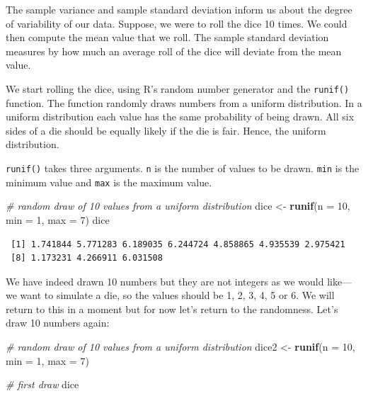 \documentclass[]{article}
\newenvironment{Shaded}{\begin{snugshade}}{\end{snugshade}}
\newcommand{\CommentTok}[1]{\textcolor[rgb]{0.56,0.35,0.01}{\textit{#1}}}
\newcommand{\DataTypeTok}[1]{\textcolor[rgb]{0.13,0.29,0.53}{#1}}
\newcommand{\DecValTok}[1]{\textcolor[rgb]{0.00,0.00,0.81}{#1}}
\newcommand{\KeywordTok}[1]{\textcolor[rgb]{0.13,0.29,0.53}{\textbf{#1}}}
\newcommand{\NormalTok}[1]{#1}
\newcommand{\StringTok}[1]{\textcolor[rgb]{0.31,0.60,0.02}{#1}}
\begin{document}
The sample variance and sample standard deviation inform us about the degree of variability of our data. Suppose, we were to roll the dice 10 times. We could then compute the mean value that we roll. The sample standard deviation measures by how much an average roll of the dice will deviate from the mean value.

We start rolling the dice, using R's random number generator and the \texttt{runif()} function. The function randomly draws numbers from a uniform distribution. In a uniform distribution each value has the same probability of being drawn. All six sides of a die should be equally likely if the die is fair. Hence, the uniform distribution.

\texttt{runif()} takes three arguments. \texttt{n} is the number of values to be drawn. \texttt{min} is the minimum value and \texttt{max} is the maximum value.

\begin{Shaded}
\begin{Highlighting}[]
\CommentTok{# random draw of 10 values from a uniform distribution}
\NormalTok{dice <-}\StringTok{ }\KeywordTok{runif}\NormalTok{(}\DataTypeTok{n =} \DecValTok{10}\NormalTok{, }\DataTypeTok{min =} \DecValTok{1}\NormalTok{, }\DataTypeTok{max =} \DecValTok{7}\NormalTok{)}
\NormalTok{dice}
\end{Highlighting}
\end{Shaded}

\begin{verbatim}
 [1] 1.741844 5.771283 6.189035 6.244724 4.858865 4.935539 2.975421
 [8] 1.173231 4.266911 6.031508
\end{verbatim}

We have indeed drawn 10 numbers but they are not integers as we would like---we want to simulate a die, so the values should be 1, 2, 3, 4, 5 or 6. We will return to this in a moment but for now let's return to the randomness. Let's draw 10 numbers again:

\begin{Shaded}
\begin{Highlighting}[]
\CommentTok{# random draw of 10 values from a uniform distribution}
\NormalTok{dice2 <-}\StringTok{ }\KeywordTok{runif}\NormalTok{(}\DataTypeTok{n =} \DecValTok{10}\NormalTok{, }\DataTypeTok{min =} \DecValTok{1}\NormalTok{, }\DataTypeTok{max =} \DecValTok{7}\NormalTok{)}

\CommentTok{# first draw}
\NormalTok{dice}
\end{Highlighting}
\end{Shaded}
\end{document}

